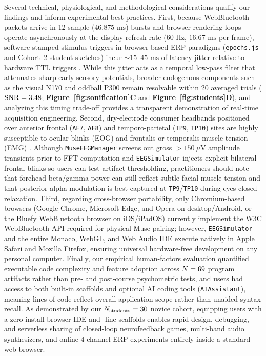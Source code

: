 \documentclass[10pt,twocolumn]{article}
\begin{document}
Several technical, physiological, and methodological considerations qualify our findings and inform experimental best practices. First, because WebBluetooth packets arrive in 12-sample ($46.875\text{ ms}$) bursts and browser rendering loops operate asynchronously at the display refresh rate ($60\text{ Hz}$, $16.67\text{ ms}$ per frame), software-stamped stimulus triggers in browser-based ERP paradigms (\texttt{epochs.js} and Cohort~2 student sketches) incur $\sim 15\text{--}45\text{ ms}$ of latency jitter relative to hardware TTL triggers \citep{krigolson2017choosing,kuziek2017transitioning,kuziek2018increasing}. While this jitter acts as a temporal low-pass filter that attenuates sharp early sensory potentials, broader endogenous components such as the visual N170 and oddball P300 remain resolvable within 20 averaged trials ($\text{SNR} = 3.48$; \textbf{Figure~\ref{fig:sonification}C} and \textbf{Figure~\ref{fig:students}D}), and analyzing this timing trade-off provides a transparent demonstration of real-time acquisition engineering. Second, dry-electrode consumer headbands positioned over anterior frontal (\texttt{AF7}, \texttt{AF8}) and temporo-parietal (\texttt{TP9}, \texttt{TP10}) sites are highly susceptible to ocular blinks (EOG) and frontalis or temporalis muscle tension (EMG) \citep{lotte2013flaws,mathewson2017high}. Although \texttt{MuseEEGManager} screens out gross $>150\ \mu\text{V}$ amplitude transients prior to FFT computation and \texttt{EEGSimulator} injects explicit bilateral frontal blinks so users can test artifact thresholding, practitioners should note that forehead beta/gamma power can still reflect subtle facial muscle tension and that posterior alpha modulation is best captured at \texttt{TP9}/\texttt{TP10} during eyes-closed relaxation. Third, regarding cross-browser portability, only Chromium-based browsers (Google Chrome, Microsoft Edge, and Opera on desktop/Android, or the Bluefy WebBluetooth browser on iOS/iPadOS) currently implement the W3C WebBluetooth API required for physical Muse pairing; however, \texttt{EEGSimulator} and the entire Monaco, WebGL, and Web Audio IDE execute natively in Apple Safari and Mozilla Firefox, ensuring universal hardware-free development on any personal computer. Finally, our empirical human-factors evaluation quantified executable code complexity and feature adoption across $N = 69$ program artifacts rather than pre- and post-course psychometric tests, and users had access to both built-in scaffolds and optional AI coding tools (\texttt{AIAssistant}), meaning lines of code reflect overall application scope rather than unaided syntax recall. As demonstrated by our $N_{\text{students}} = 30$ novice cohort, equipping users with a zero-install browser IDE and \ExLOCMedian-line scaffolds enables rapid design, debugging, and serverless sharing of closed-loop neurofeedback games, multi-band audio synthesizers, and online 4-channel ERP experiments entirely inside a standard web browser.
\end{document}

